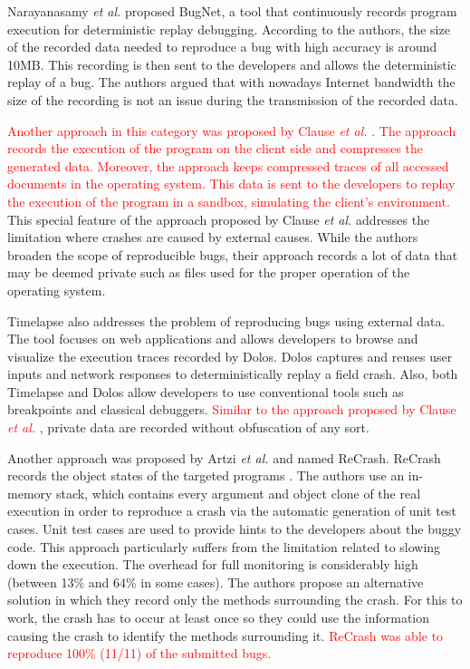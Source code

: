 \documentclass[times, doublespace]{smrauth}
\newcommand{\red}[1]{\textcolor{red}{#1}}
\begin{document}
Narayanasamy {\it et al.} \cite{Narayanasamy2005} proposed BugNet, a tool that continuously records program execution for deterministic replay debugging. According to the authors, the size of the recorded data needed to reproduce a bug with high accuracy is around 10MB. This recording is then sent to the developers and allows the deterministic replay of a bug. The authors argued that with nowadays Internet bandwidth the size of the recording is not an issue during the transmission of the recorded data.

\red{Another approach in this category was  proposed by Clause {\it et al.} \cite{Clause2007}. The approach records the execution of the program on the client side and compresses the generated data. Moreover, the approach keeps compressed traces of all accessed documents in the operating system.
This data is sent to the developers to replay the execution of the program in a sandbox, simulating the client's environment.}
This special feature of the approach proposed by Clause {\it et al.} addresses the limitation where crashes are caused by external causes. While the authors broaden the scope of reproducible bugs, their approach records a lot of data that may be deemed private such as files used for the proper operation of the operating system.

Timelapse \cite{Burg2013} also addresses the problem of reproducing bugs using external data. The tool focuses on web applications and allows developers to browse and visualize the execution traces recorded by Dolos. Dolos captures and reuses user inputs and network responses to deterministically replay a field crash. Also, both Timelapse and Dolos allow developers to use conventional tools such as breakpoints and classical debuggers. \red{Similar to the approach proposed by Clause {\it et al.} \cite{Clause2007}}, private data are recorded without obfuscation of any sort.

Another approach was proposed by Artzi {\it et al.} and named ReCrash. ReCrash records the object states of the targeted programs \cite{Artzi2008}. The authors use an in-memory stack, which contains every argument and object clone of the real execution in order to reproduce a crash via the automatic generation of unit test cases.
Unit test cases are used to provide hints to the developers about the buggy code.
This approach particularly suffers from the limitation related to slowing down the execution.
The overhead for full monitoring is considerably high (between 13\% and 64\% in some cases).
The authors  propose an alternative solution in which they record only the methods surrounding the crash. For this to work, the crash has to occur at least once so they could use the information causing the crash to identify the methods surrounding it. \red{ReCrash was able to reproduce 100\% (11/11) of the submitted bugs.}
\end{document}
